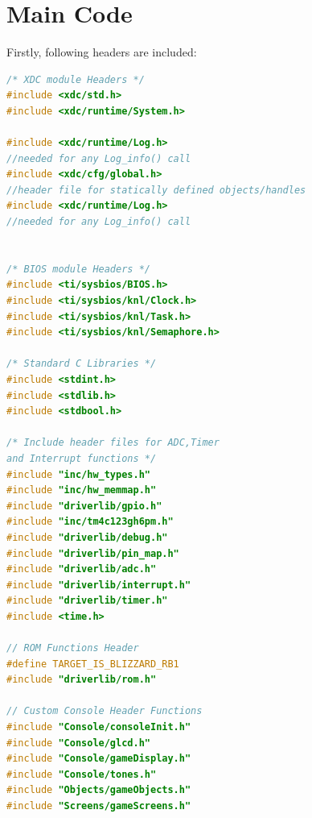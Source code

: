 \documentclass{article}
\begin{document}
\section{Main Code}
\qquad Firstly, following headers are included:
  \begin{lstlisting}[basicstyle = \small, language = C]
/* XDC module Headers */
#include <xdc/std.h>
#include <xdc/runtime/System.h>

#include <xdc/runtime/Log.h>                
//needed for any Log_info() call
#include <xdc/cfg/global.h>                 
//header file for statically defined objects/handles
#include <xdc/runtime/Log.h>                
//needed for any Log_info() call


/* BIOS module Headers */
#include <ti/sysbios/BIOS.h>
#include <ti/sysbios/knl/Clock.h>
#include <ti/sysbios/knl/Task.h>
#include <ti/sysbios/knl/Semaphore.h>

/* Standard C Libraries */
#include <stdint.h>
#include <stdlib.h>
#include <stdbool.h>

/* Include header files for ADC,Timer 
and Interrupt functions */
#include "inc/hw_types.h"
#include "inc/hw_memmap.h"
#include "driverlib/gpio.h"
#include "inc/tm4c123gh6pm.h"
#include "driverlib/debug.h"
#include "driverlib/pin_map.h"
#include "driverlib/adc.h"
#include "driverlib/interrupt.h"
#include "driverlib/timer.h"
#include <time.h>

// ROM Functions Header
#define TARGET_IS_BLIZZARD_RB1
#include "driverlib/rom.h"

// Custom Console Header Functions
#include "Console/consoleInit.h"
#include "Console/glcd.h"
#include "Console/gameDisplay.h"
#include "Console/tones.h"
#include "Objects/gameObjects.h"
#include "Screens/gameScreens.h"
  \end{lstlisting}
\end{document}
